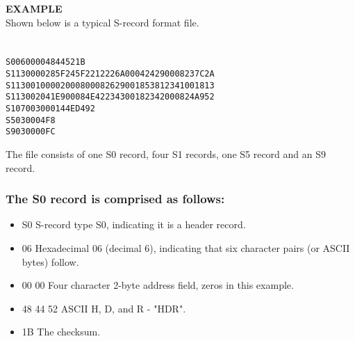                 \textbf{EXAMPLE}\\
                Shown below is a typical S-record format file.
                    {
                        ~\\
                        \usecodefont\\
                        \verb''\\
                        \verb'S00600004844521B'\\
                        \verb'S1130000285F245F2212226A000424290008237C2A'\\
                        \verb'S11300100002000800082629001853812341001813'\\
                        \verb'S113002041E900084E42234300182342000824A952'\\
                        \verb'S107003000144ED492'\\
                        \verb'S5030004F8'\\
                        \verb'S9030000FC'\\
                    }

                The file consists of one S0 record, four S1 records, one S5 record and
                an S9 record.

                \subsubsection{The S0 record is comprised as follows:}
                    \begin{itemize}
                        \item S0 S-record type S0, indicating it is a header record.
                        \item 06 Hexadecimal 06 (decimal 6), indicating that six character pairs (or ASCII bytes) follow.
                        \item 00 00 Four character 2-byte address field, zeros in this example.
                        \item 48 44 52 ASCII H, D, and R - "HDR".
                        \item 1B The checksum.
                    \end{itemize}

